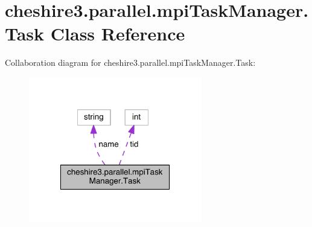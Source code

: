 \hypertarget{classcheshire3_1_1parallel_1_1mpi_task_manager_1_1_task}{\section{cheshire3.\-parallel.\-mpi\-Task\-Manager.\-Task Class Reference}
\label{classcheshire3_1_1parallel_1_1mpi_task_manager_1_1_task}
}


Collaboration diagram for cheshire3.\-parallel.\-mpi\-Task\-Manager.\-Task\-:
\nopagebreak
\begin{figure}[H]
\begin{center}
\leavevmode
\includegraphics[width=214pt]{classcheshire3_1_1parallel_1_1mpi_task_manager_1_1_task__coll__graph}
\end{center}
\end{figure}

